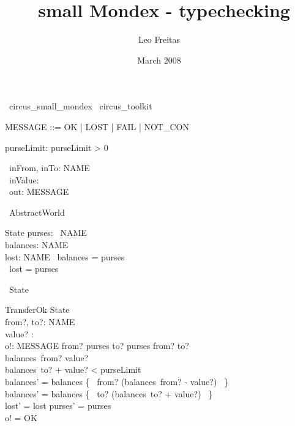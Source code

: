 \documentclass{article}
\begin{document}
\title{\Circus\ small Mondex - typechecking}
\author{Leo Freitas}
\date{March 2008}

\maketitle

\begin{zsection}
  \SECTION\ circus\_small\_mondex \parents\ circus\_toolkit
\end{zsection}

\begin{zed}
   [NAME] 
   \also
   MESSAGE ::= OK | LOST | FAIL | NOT\_CON
\end{zed}

\begin{axdef}
   purseLimit: \nat
\where
   purseLimit > 0
\end{axdef}

\begin{circus}
   \circchannel\ inFrom, inTo: NAME \\
   \circchannel\ inValue: \nat \\
   \circchannel\ out: MESSAGE
\end{circus}

\begin{circus}
   \circprocess\ AbstractWorld \circdef \circbegin
\end{circus}

\begin{schema}{State}
   purses: \power~NAME \\
   balances: NAME \pfun \nat \\
   lost: NAME \pfun \nat 
\where
   \dom~balances = purses \\
   \dom~lost = purses
\end{schema}

\begin{circusaction}
   \circstate\ State
\end{circusaction}

\begin{schema}{TransferOk}
   \Delta State \\
   from?, to?: NAME \\
   value? : \nat \\
   o!: MESSAGE
\where
   from? \in purses \land  to? \in purses \land from? \neq to? \\
   balances~from? \geq value? \\
   balances~to? + value? < purseLimit \\
   balances' = balances \oplus \{~ from? \mapsto (balances~from? - value?) ~\} \\
   balances' = balances \oplus \{~ to? \mapsto (balances~to? + value?) ~\} \\
   lost' = lost \land purses' = purses \\
   o! = OK
\end{schema}
\end{document}
